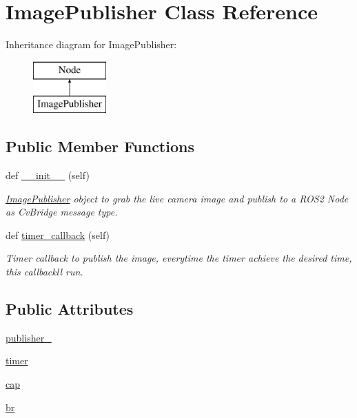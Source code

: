 \hypertarget{classtoxic__vision_1_1webcam__pub_1_1ImagePublisher}{}\section{Image\+Publisher Class Reference}
\label{classtoxic__vision_1_1webcam__pub_1_1ImagePublisher}
Inheritance diagram for Image\+Publisher\+:\begin{figure}[H]
\begin{center}
\leavevmode
\includegraphics[height=2.000000cm]{d2/da6/classtoxic__vision_1_1webcam__pub_1_1ImagePublisher}
\end{center}
\end{figure}
\subsection*{Public Member Functions}
\begin{DoxyCompactItemize}
\item 
def \mbox{\hyperlink{classtoxic__vision_1_1webcam__pub_1_1ImagePublisher_ae64f0875afe3067b97ba370b354b9213}{\+\_\+\+\_\+init\+\_\+\+\_\+}} (self)
\begin{DoxyCompactList}\small\item\em \mbox{\hyperlink{classtoxic__vision_1_1webcam__pub_1_1ImagePublisher}{Image\+Publisher}} object to grab the live camera image and publish to a R\+O\+S2 Node as Cv\+Bridge message type. \end{DoxyCompactList}\item 
def \mbox{\hyperlink{classtoxic__vision_1_1webcam__pub_1_1ImagePublisher_a9692d7a212fa89bc61dacc687e826097}{timer\+\_\+callback}} (self)
\begin{DoxyCompactList}\small\item\em Timer callback to publish the image, everytime the timer achieve the desired time, this callback\textquotesingle{}ll run. \end{DoxyCompactList}\end{DoxyCompactItemize}
\subsection*{Public Attributes}
\begin{DoxyCompactItemize}
\item 
\mbox{\hyperlink{classtoxic__vision_1_1webcam__pub_1_1ImagePublisher_a2ab19359a5607f32a7b39d6d9f61c3b5}{publisher\+\_\+}}
\item 
\mbox{\hyperlink{classtoxic__vision_1_1webcam__pub_1_1ImagePublisher_a9fabcf6aa0647a2414f7cb1a2ab2634a}{timer}}
\item 
\mbox{\hyperlink{classtoxic__vision_1_1webcam__pub_1_1ImagePublisher_a9499a5c7f196d66c6afe0222bd5a9219}{cap}}
\item 
\mbox{\hyperlink{classtoxic__vision_1_1webcam__pub_1_1ImagePublisher_a88f0860257ba6bdc089557444f5cdd16}{br}}
\end{DoxyCompactItemize}



